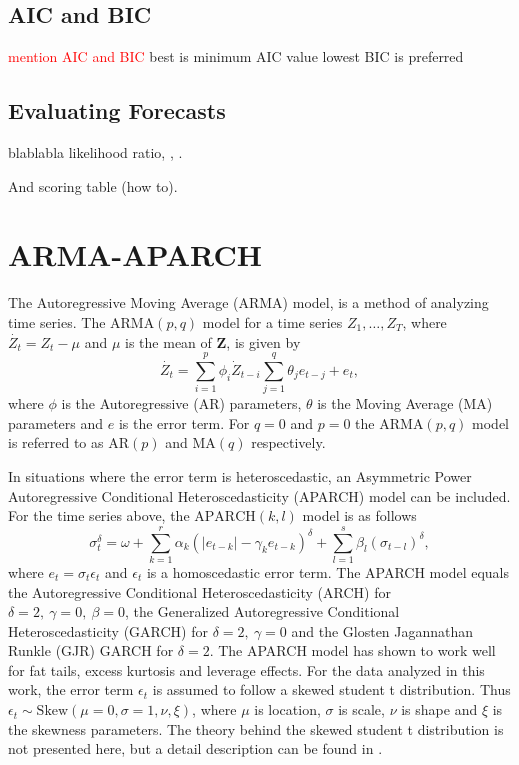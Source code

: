 \subsection{AIC and BIC}
\textcolor{red}{mention AIC and BIC}
best is minimum AIC value
lowest BIC is preferred

\subsection{Evaluating Forecasts}
blablabla likelihood ratio, \cite{kupiec}, \cite{christoffersen}.

And scoring table (how to).
\section{ARMA-APARCH}%
The Autoregressive Moving Average (ARMA) model, is a method of analyzing time series. The $\text{ARMA}(p,q)$ model for a time series $Z_{1}, \dots, Z_{T}$, where $\dot{Z_t}=Z_t-\mu$ and $\mu$ is the mean of $\boldsymbol{Z}$, is given by
\begin{equation}
\dot{Z_t}=\sum_{i=1}^{p} \phi_i \dot{Z}_{t-i} \sum_{j=1}^{q} \theta_j e_{t-j}+e_{t},
\end{equation}
where $\phi$ is the Autoregressive (AR) parameters, $\theta$ is the Moving Average (MA) parameters and $e$ is the error term. For $q=0$ and $p=0$ the $\text{ARMA}(p,q)$ model is referred to as $\text{AR}(p)$ and $\text{MA}(q)$ respectively.

In situations where the error term is heteroscedastic, an Asymmetric Power Autoregressive Conditional Heteroscedasticity (APARCH) model can be included. For the time series above, the $\text{APARCH}(k,l)$ model is as follows
\begin{equation}
\sigma_{t}^{\delta}=\omega+\sum_{k=1}^{r}\alpha_k \left(|e_{t-k}|-\gamma_k e_{t-k} \right)^{\delta}+\sum_{l=1}^{s}\beta_l(\sigma_{t-l})^{\delta},
\end{equation}
where $e_{t}=\sigma_{t}\epsilon_{t}$ and $\epsilon_{t}$ is a homoscedastic error term. The APARCH model equals the Autoregressive Conditional Heteroscedasticity (ARCH) for $\delta=2, \ \gamma=0, \ \beta=0$, the Generalized Autoregressive Conditional Heteroscedasticity (GARCH) for $\delta=2, \ \gamma=0$ and the Glosten Jagannathan Runkle (GJR) GARCH for $\delta=2$.
The APARCH model has shown to work well for fat tails, excess kurtosis and leverage effects.
For the data analyzed in this work, the error term $\epsilon_{t}$ is assumed to follow a skewed student t distribution. Thus $\epsilon_{t} \sim \text{Skew}(\mu=0,\sigma=1,\nu,\xi)$, where $\mu$ is location, $\sigma$ is scale, $\nu$ is shape and $\xi$ is the skewness parameters. The theory behind the skewed student t distribution is not presented here, but a detail description can be found in \cite{sstd}. 